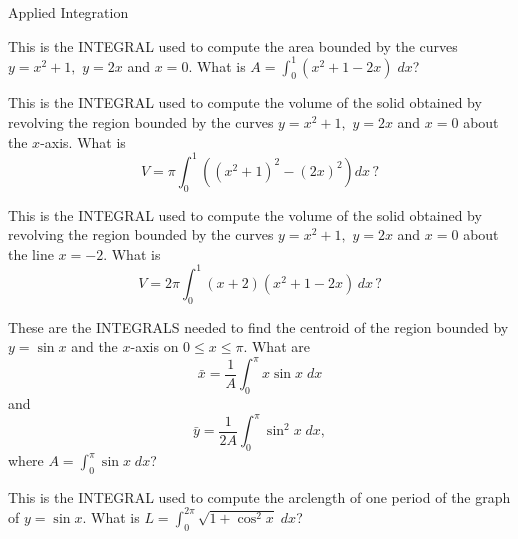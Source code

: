 \documentclass{article}
\begin{document}
\begin{category}{Applied Integration}

  \begin{clue}
    This is the INTEGRAL used to compute the area bounded by the curves
    $y=x^2+1,$ $y=2x$ and $x=0.$
  \response
    What is $\displaystyle A=\int_0^1 (x^2+1-2x)\; dx$?
  \end{clue}

  \begin{clue}
    This is the INTEGRAL used to compute the volume of the solid obtained by
    revolving the region bounded by the curves $y=x^2+1,$ $y=2x$ and $x=0$
    about the $x$-axis.
  \response
    What is
    \[V=\pi\int_0^1 \left((x^2+1)^2-(2x)^2\right) dx\,?\]
  \end{clue}

  \begin{clue}[dailydouble]
    This is the INTEGRAL used to compute the volume of the solid obtained by
    revolving the region bounded by the curves $y=x^2+1,$ $y=2x$ and $x=0$
    about the line $x=-2.$
  \response
    What is
    \[V=2\pi\int_0^1 (x+2)(x^2+1-2x)\, dx\,?\]
  \end{clue}

  \begin{clue}
    These are the INTEGRALS needed to find the centroid of the region bounded
    by $y=\sin x$ and the $x$-axis on $0\le x\le \pi.$
  \response
    What are
    \[\bar x=\frac{1}{A}\int_{0}^{\pi}x\sin x\; dx\]
    and
    \[\bar y=\frac{1}{2A}\int_{0}^{\pi}\sin^{2}x\;dx,\]
    where $\displaystyle A=\int_{0}^{\pi}\sin x\; dx$?
  \end{clue}

  \begin{clue}
    This is the INTEGRAL used to compute the arclength of one period of the
    graph of $y=\sin x.$
  \response
    What is $\displaystyle L=\int_0^{2\pi}\sqrt{1+\cos^2 x}\; dx$?
  \end{clue}

\end{category}
\end{document}

